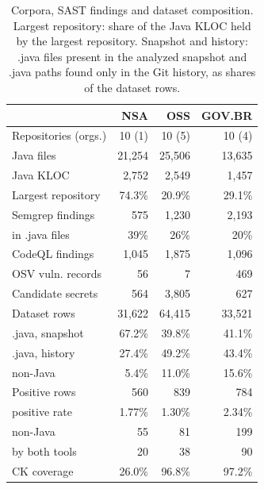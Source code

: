 \documentclass[a4paper,twoside]{article}
\begin{document}
\begin{table}[t]
\caption{Corpora, SAST findings and dataset composition. Largest repository: share of the Java KLOC held by the largest repository. Snapshot and history: .java files present in the analyzed snapshot and .java paths found only in the Git history, as shares of the dataset rows.}\label{tab:corpora}
\centering
\footnotesize
\begin{tabular}{@{}lrrr@{}}
\toprule
 & NSA & OSS & GOV.BR \\
\midrule
Repositories (orgs.) & 10 (1) & 10 (5) & 10 (4) \\
Java files & 21,254 & 25,506 & 13,635 \\
Java KLOC & 2,752 & 2,549 & 1,457 \\
Largest repository & 74.3\% & 20.9\% & 29.1\% \\
Semgrep findings & 575 & 1,230 & 2,193 \\
\quad in .java files & 39\% & 26\% & 20\% \\
CodeQL findings & 1,045 & 1,875 & 1,096 \\
OSV vuln. records & 56 & 7 & 469 \\
Candidate secrets & 564 & 3,805 & 627 \\
\midrule
Dataset rows & 31,622 & 64,415 & 33,521 \\
\quad .java, snapshot & 67.2\% & 39.8\% & 41.1\% \\
\quad .java, history & 27.4\% & 49.2\% & 43.4\% \\
\quad non-Java & 5.4\% & 11.0\% & 15.6\% \\
Positive rows & 560 & 839 & 784 \\
\quad positive rate & 1.77\% & 1.30\% & 2.34\% \\
\quad non-Java & 55 & 81 & 199 \\
\quad by both tools & 20 & 38 & 90 \\
CK coverage & 26.0\% & 96.8\% & 97.2\% \\
\bottomrule
\end{tabular}
\end{table}
\end{document}
